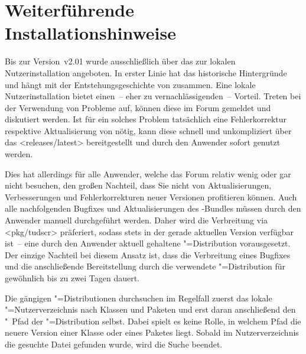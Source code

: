 \chapter{%
  Weiterführende Installationshinweise%
  \label{sec:install:ext}%
}
\noindent{}

\bigskip\noindent
Bis zur Version~v2.01 wurde \TUDScript ausschließlich über das \Forum zur 
lokalen Nutzerinstallation angeboten. In erster Linie hat das historische 
Hintergründe und hängt mit der Entstehungsgeschichte von \TUDScript zusammen. 
Eine lokale Nutzerinstallation bietet einen~-- eher zu vernachlässigenden~-- 
Vorteil. Treten bei der Verwendung von \TUDScript Probleme auf, können diese im 
Forum gemeldet und diskutiert werden. Ist für ein solches Problem tatsächlich 
eine Fehlerkorrektur respektive Aktualisierung von \TUDScript nötig, kann diese 
schnell und unkompliziert über das \GitHubRepo<releases/latest> bereitgestellt 
und durch den Anwender sofort genutzt werden.

Dies hat allerdings für alle Anwender, welche das Forum relativ wenig oder gar 
nicht besuchen, den großen Nachteil, dass Sie nicht von Aktualisierungen, 
Verbesserungen und Fehlerkorrekturen neuer Versionen profitieren können. Auch 
alle nachfolgenden Bugfixes und Aktualisierungen des \TUDScript-Bundles müssen 
durch den Anwender manuell durchgeführt werden. Daher wird die Verbreitung via 
\CTAN<pkg/tudscr> präferiert, sodass \TUDScript stets in der gerade aktuellen 
Version verfügbar ist~-- eine durch den Anwender aktuell gehaltene 
"=Distribution vorausgesetzt. Der einzige Nachteil bei diesem 
Ansatz ist, dass die Verbreitung eines Bugfixes und die anschließende 
Bereitstellung durch die verwendete "=Distribution für gewöhnlich 
bis zu zwei Tagen dauert.

Die gängigen "=Distributionen durchsuchen im Regelfall zuerst das 
lokale "=Nutzerverzeichnis nach Klassen und Paketen und erst daran 
anschließend den "~Pfad der "=Distribution selbst. 
Dabei spielt es keine Rolle, in welchem Pfad die neuere Version einer Klasse 
oder eines Paketes liegt. Sobald im Nutzerverzeichnis die gesuchte Datei 
gefunden wurde, wird die Suche beendet.

